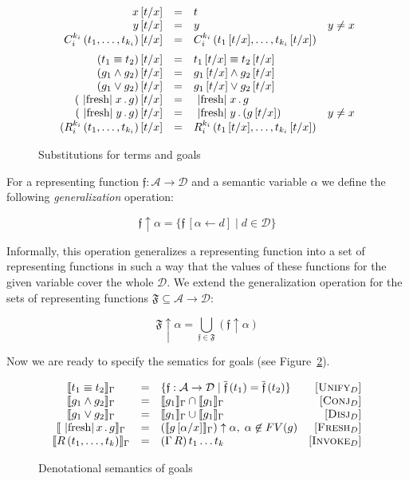 \begin{figure}[t]
\[
\begin{array}{rcll}
  x\,[t/x] &=& t &\\
  y\,[t/x] &=& y & y\ne x\\
  C_i^{k_i}\,(t_1,\dots,t_{k_i})\,[t/x]&=&C_i^{k_i}\,(t_1\,[t/x],\dots,t_{k_i}\,[t/x])&\\[2mm]
  (t_1 \equiv t_2)\,[t/x]&=&t_1\,[t/x] \equiv t_2\,[t/x]&\\
  (g_1 \wedge g_2)\,[t/x]&=&g_1\,[t/x] \wedge g_2\,[t/x]&\\
  (g_1 \vee g_2)\,[t/x]&=&g_1\,[t/x] \vee g_2\,[t/x]&\\
  (\mbox{\lstinline|fresh|}\;x\,.\,g)\,[t/x]&=&\mbox{\lstinline|fresh|}\;x\,.\,g&\\
  (\mbox{\lstinline|fresh|}\;y\,.\,g)\,[t/x]&=&\mbox{\lstinline|fresh|}\;y\,.\,(g\,[t/x])&y\ne x\\
  (R_i^{k_i}\,(t_1,\dots,t_{k_i})\,[t/x]&=&R_i^{k_i}\,(t_1\,[t/x],\dots,t_{k_i}\,[t/x])&
\end{array}
\]
  \caption{Substitutions for terms and goals}
  \label{substitution}
\end{figure}

For a representing function $\mathfrak{f}:\mathcal{A}\to\mathcal{D}$ and a semantic variable $\alpha$ we define
the following \emph{generalization} operation:

\[
\mathfrak{f}\uparrow\alpha = \{ \mathfrak{f}\,[\alpha\gets d] \mid d\in\mathcal D\}
\]

Informally, this operation generalizes a representing function into a set of representing functions in such a way that the
values of these functions for the given variable cover the whole $\mathcal{D}$. We extend the generalization operation for the sets of
representing functions $\mathfrak{F}\subseteq\mathcal{A}\to\mathcal{D}$:

\[
  \mathfrak{F}\uparrow\alpha = \bigcup_{\mathfrak{f}\in\mathfrak{F}}(\mathfrak{f}\uparrow\alpha)
\]

Now we are ready to specify the sematics for goals (see Figure~\ref{denotational_semantics_of_goals}).

\begin{figure}[t]
  \[
  \begin{array}{cclr}
    \sembr{t_1\equiv t_2}_\Gamma&=&\{\mathfrak f : \mathcal{A}\to\mathcal{D}\mid \overline{\mathfrak{f}}\,(t_1)=\overline{\mathfrak{f}}\,(t_2)\}& \mbox{[\textsc{Unify$_D$}]}\\
    \sembr{g_1\wedge g_2}_\Gamma&=&\sembr{g_1}_\Gamma\cap\sembr{g_1}_\Gamma&\mbox{[\textsc{Conj$_D$}]}\\
    \sembr{g_1\vee g_2}_\Gamma&=&\sembr{g_1}_\Gamma\cup\sembr{g_1}_\Gamma&\mbox{[\textsc{Disj$_D$}]}\\
    \sembr{\mbox{\lstinline|fresh|}\,x\,.\,g}_\Gamma&=&(\sembr{g\,[\alpha/x]}_\Gamma)\uparrow\alpha,\;\alpha\not\in FV(g)& \mbox{[\textsc{Fresh$_D$}]}\\
    \sembr{R\,(t_1,\dots,t_k)}_\Gamma&=&(\Gamma\,R)\,t_1\dots t_k & \mbox{[\textsc{Invoke$_D$}]}
  \end{array}
  \]
  \caption{Denotational semantics of goals}
  \label{denotational_semantics_of_goals}
\end{figure}

